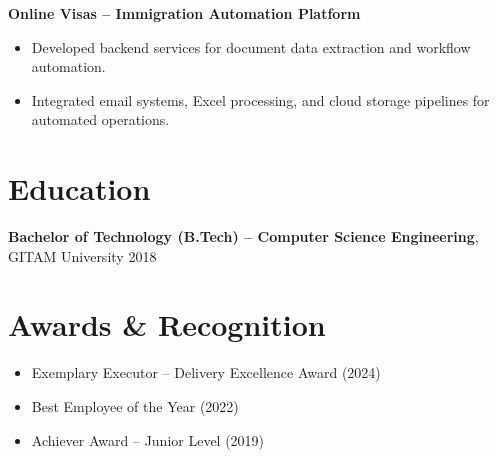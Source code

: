 \documentclass[a4paper,10pt]{article}
\begin{document}
\vspace{0.5em}

\textbf{Online Visas -- Immigration Automation Platform} \\
\vspace{-5mm}
\begin{itemize}[leftmargin=*,itemsep=0.2em]
    \item Developed backend services for document data extraction and workflow automation.
    \item Integrated email systems, Excel processing, and cloud storage pipelines for automated operations.
\end{itemize}

\vspace{-2mm}
\noindent\makebox[\linewidth]{\rule{\linewidth}{0.4pt}}

\section*{Education}
\textbf{Bachelor of Technology (B.Tech) -- Computer Science Engineering}, GITAM University \hfill 2018 \\
\noindent\makebox[\linewidth]{\rule{\linewidth}{0.4pt}}

\section*{Awards \& Recognition}
\begin{itemize}[leftmargin=*,itemsep=0.2em]
    \item Exemplary Executor -- Delivery Excellence Award (2024)
    \item Best Employee of the Year (2022)
    \item Achiever Award -- Junior Level (2019)
\end{itemize}
\noindent\makebox[\linewidth]{\rule{\linewidth}{0.4pt}}
\end{document}
